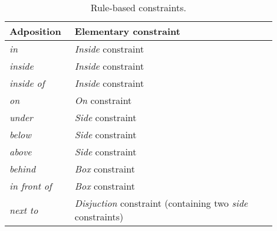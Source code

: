\begin{table}[ht]
    \small
    \centering
    \begin{threeparttable}
        \begin{tabular}{p{0.2\linewidth}|p{0.7\linewidth}}
            \textbf{Adposition} & \textbf{Elementary constraint} \\
            \hline \hline
            \emph{in}       &  \emph{Inside} constraint \\
            \hline
            \emph{inside}    & \emph{Inside} constraint \\
            \hline
            \emph{inside of} & \emph{Inside} constraint \\
            \hline
            \emph{on}        & \emph{On} constraint \\
            \hline
            \emph{under}     & \emph{Side} constraint \\
            \hline
            \emph{below}     & \emph{Side} constraint \\
            \hline
            \emph{above}    & \emph{Side} constraint \\
            \hline
            \emph{behind}    & \emph{Box} constraint \\
            \hline
            \emph{in front of} & \emph{Box} constraint \\
            \hline
            \emph{next to} & \emph{Disjuction} constraint (containing two \emph{side} constraints)
        \end{tabular}
    \end{threeparttable}
    \caption[Rule-based constraints]{Rule-based constraints.}
    \label{tab:rule_based_constraints}
\end{table}